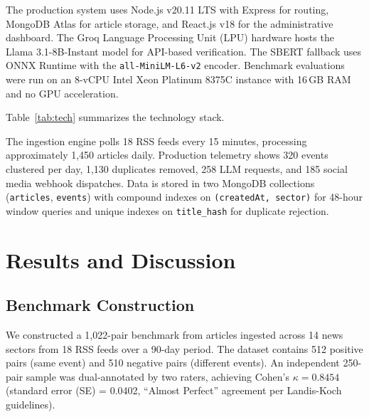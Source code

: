 \documentclass[conference]{IEEEtran}
\begin{document}
The production system uses Node.js v20.11 LTS with Express for routing, MongoDB Atlas for article storage, and React.js v18 for the administrative dashboard.
The Groq Language Processing Unit (LPU) hardware hosts the Llama 3.1-8B-Instant model for API-based verification.
The SBERT fallback uses ONNX Runtime with the \texttt{all-MiniLM-L6-v2} encoder.
Benchmark evaluations were run on an 8-vCPU Intel Xeon Platinum 8375C instance with 16\,GB RAM and no GPU acceleration.

Table~\ref{tab:tech} summarizes the technology stack.

\begin{table}[!t]
\centering
\caption{Development Environment and Technologies}
\label{tab:tech}
\end{table}

The ingestion engine polls 18 RSS feeds every 15 minutes, processing approximately 1,450 articles daily.
Production telemetry shows 320 events clustered per day, 1,130 duplicates removed, 258 LLM requests, and 185 social media webhook dispatches.
Data is stored in two MongoDB collections (\texttt{articles}, \texttt{events}) with compound indexes on \texttt{(createdAt, sector)} for 48-hour window queries and unique indexes on \texttt{title\_hash} for duplicate rejection.

\section{Results and Discussion}

\subsection{Benchmark Construction}
We constructed a 1,022-pair benchmark from articles ingested across 14 news sectors from 18 RSS feeds over a 90-day period.
The dataset contains 512 positive pairs (same event) and 510 negative pairs (different events).
An independent 250-pair sample was dual-annotated by two raters, achieving Cohen's $\kappa = 0.8454$ (standard error (SE) = 0.0402, ``Almost Perfect'' agreement per Landis-Koch guidelines).
\end{document}

